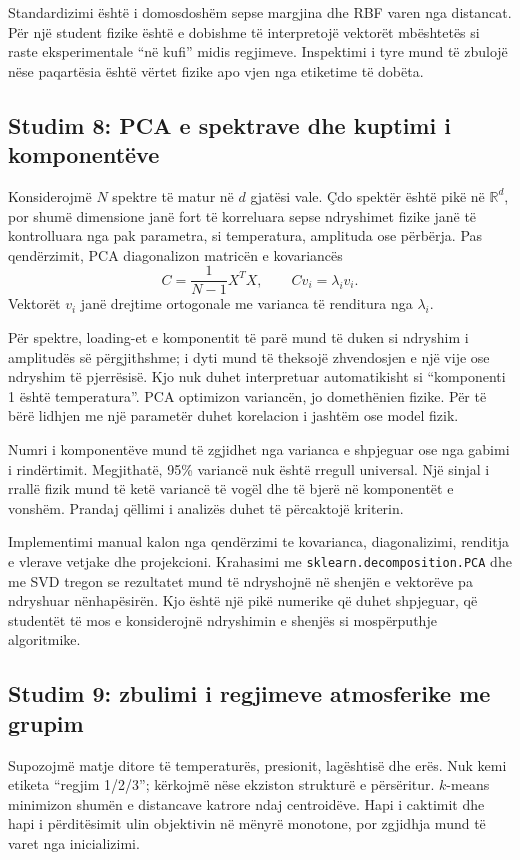 \documentclass[12pt,a4paper,oneside]{book}
\begin{document}
Standardizimi është i domosdoshëm sepse margjina dhe RBF varen nga distancat. Për një student fizike është e dobishme të interpretojë vektorët mbështetës si raste eksperimentale “në kufi” midis regjimeve. Inspektimi i tyre mund të zbulojë nëse paqartësia është vërtet fizike apo vjen nga etiketime të dobëta.

\subsection*{Studim 8: PCA e spektrave dhe kuptimi i komponentëve}
Konsiderojmë $N$ spektre të matur në $d$ gjatësi vale. Çdo spektër është pikë në $\mathbb R^d$, por shumë dimensione janë fort të korreluara sepse ndryshimet fizike janë të kontrolluara nga pak parametra, si temperatura, amplituda ose përbërja. Pas qendërzimit, PCA diagonalizon matricën e kovariancës
\[
C=\frac1{N-1}X^TX,
\qquad Cv_i=\lambda_i v_i.
\]
Vektorët $v_i$ janë drejtime ortogonale me varianca të renditura nga $\lambda_i$.

Për spektre, loading-et e komponentit të parë mund të duken si ndryshim i amplitudës së përgjithshme; i dyti mund të theksojë zhvendosjen e një vije ose ndryshim të pjerrësisë. Kjo nuk duhet interpretuar automatikisht si “komponenti 1 është temperatura”. PCA optimizon variancën, jo domethënien fizike. Për të bërë lidhjen me një parametër duhet korelacion i jashtëm ose model fizik.

Numri i komponentëve mund të zgjidhet nga varianca e shpjeguar ose nga gabimi i rindërtimit. Megjithatë, 95\% variancë nuk është rregull universal. Një sinjal i rrallë fizik mund të ketë variancë të vogël dhe të bjerë në komponentët e vonshëm. Prandaj qëllimi i analizës duhet të përcaktojë kriterin.

Implementimi manual kalon nga qendërzimi te kovarianca, diagonalizimi, renditja e vlerave vetjake dhe projekcioni. Krahasimi me \texttt{sklearn.decomposition.PCA} dhe me SVD tregon se rezultatet mund të ndryshojnë në shenjën e vektorëve pa ndryshuar nënhapësirën. Kjo është një pikë numerike që duhet shpjeguar, që studentët të mos e konsiderojnë ndryshimin e shenjës si mospërputhje algoritmike.

\subsection*{Studim 9: zbulimi i regjimeve atmosferike me grupim}
Supozojmë matje ditore të temperaturës, presionit, lagështisë dhe erës. Nuk kemi etiketa “regjim 1/2/3”; kërkojmë nëse ekziston strukturë e përsëritur. $k$-means minimizon shumën e distancave katrore ndaj centroidëve. Hapi i caktimit dhe hapi i përditësimit ulin objektivin në mënyrë monotone, por zgjidhja mund të varet nga inicializimi.
\end{document}
